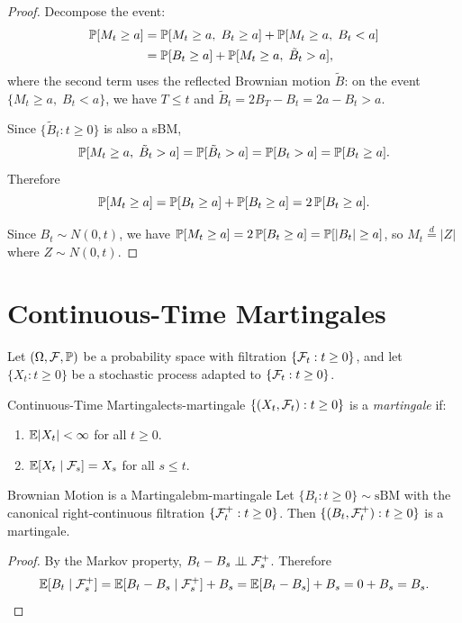 \begin{proof}
    Decompose the event:
    \begin{align*}
        \mathbb{P}[M_t \geq a]
        &= \mathbb{P}[M_t \geq a,\; B_t \geq a] + \mathbb{P}[M_t \geq a,\; B_t < a] \\
        &= \mathbb{P}[B_t \geq a] + \mathbb{P}[M_t \geq a,\; \tilde{B}_t > a],
    \end{align*}
    where the second term uses the reflected Brownian motion $\tilde{B}$: on the event $\{M_t \geq a,\; B_t < a\}$, we have $T \leq t$ and $\tilde{B}_t = 2B_T - B_t = 2a - B_t > a$.

    Since $\{\tilde{B}_t : t \geq 0\}$ is also a sBM,
    \[
        \mathbb{P}[M_t \geq a,\; \tilde{B}_t > a] = \mathbb{P}[\tilde{B}_t > a] = \mathbb{P}[B_t > a] = \mathbb{P}[B_t \geq a].
    \]
    Therefore
    \[
        \mathbb{P}[M_t \geq a] = \mathbb{P}[B_t \geq a] + \mathbb{P}[B_t \geq a] = 2\,\mathbb{P}[B_t \geq a].
    \]

    Since $B_t \sim N(0,t)$, we have $\mathbb{P}[M_t \geq a] = 2\,\mathbb{P}[B_t \geq a] = \mathbb{P}[|B_t| \geq a]$, so $M_t \stackrel{d}{=} |Z|$ where $Z \sim N(0,t)$.
\end{proof}

\section{Continuous-Time Martingales}

Let $(\Omega, \mathcal{F}, \mathbb{P})$ be a probability space with filtration $\{\mathcal{F}_t : t \geq 0\}$, and let $\{X_t : t \geq 0\}$ be a stochastic process adapted to $\{\mathcal{F}_t : t \geq 0\}$.

\begin{definition}{Continuous-Time Martingale}{cts-martingale}
    $\{(X_t, \mathcal{F}_t) : t \geq 0\}$ is a \emph{martingale} if:
    \begin{enumerate}[label=(\roman*)]
        \item $\mathbb{E}|X_t| < \infty$ for all $t \geq 0$.
        \item $\mathbb{E}[X_t \mid \mathcal{F}_s] = X_s$ for all $s \leq t$.
    \end{enumerate}
\end{definition}

\begin{example}{Brownian Motion is a Martingale}{bm-martingale}
    Let $\{B_t : t \geq 0\} \sim \mathrm{sBM}$ with the canonical right-continuous filtration $\{\mathcal{F}_t^+ : t \geq 0\}$. Then $\{(B_t, \mathcal{F}_t^+) : t \geq 0\}$ is a martingale.
\end{example}

\begin{proof}
    By the Markov property, $B_t - B_s \perp\!\!\!\perp \mathcal{F}_s^+$. Therefore
    \[
        \mathbb{E}[B_t \mid \mathcal{F}_s^+] = \mathbb{E}[B_t - B_s \mid \mathcal{F}_s^+] + B_s = \mathbb{E}[B_t - B_s] + B_s = 0 + B_s = B_s. \qedhere
    \]
\end{proof}
